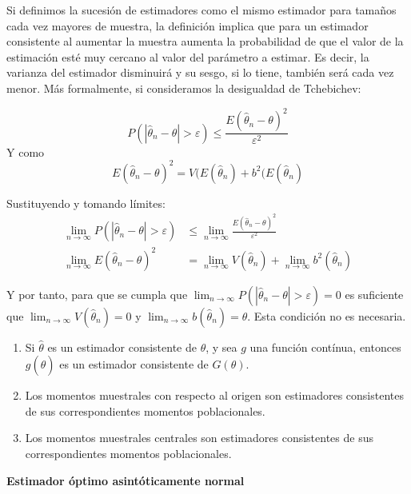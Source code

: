 Si definimos la sucesi\'on de estimadores como el mismo estimador para tama\~nos cada vez mayores de muestra, la definici\'on implica que para un estimador consistente al aumentar la muestra aumenta la probabilidad de que el valor de la estimaci\'on est\'e muy cercano al valor del par\'ametro a estimar. Es decir, la varianza del estimador disminuir\'a y su sesgo, si lo tiene, tambi\'en ser\'a cada vez menor. M\'as formalmente, si consideramos la desigualdad de Tchebichev:

\begin{equation*}
P\left(\left|\hat{\theta}_n-\theta\right|>\varepsilon\right)\leq\frac{E(\hat{\theta}_n-\theta)^2}{\varepsilon^2}
\end{equation*}
Y como
\begin{equation*}
E(\hat{\theta}_n-\theta)^2=V(E(\hat{\theta}_n)+b^2(E(\hat{\theta}_n)
\end{equation*}

Sustituyendo y tomando l\'imites:
\begin{align*}
\lim_{n\to\infty}P\left(\left|\hat{\theta}_n-\theta\right|>\varepsilon\right)&\leq\lim_{n\to\infty}\frac{E(\hat{\theta}_n-\theta)^2}{\varepsilon^2}\\
\lim_{n\to\infty}E(\hat{\theta}_n-\theta)^2&=\lim_{n\to\infty}V(\hat{\theta}_n)+\lim_{n\to\infty}b^2(\hat{\theta}_n)
\end{align*}

Y por tanto, para que se cumpla que $\lim_{n\to\infty}P\left(\left|\hat{\theta}_n-\theta\right|>\varepsilon\right)=0$ es suficiente que $\lim_{n\to\infty}V(\hat{\theta}_n)=0$ y $\lim_{n\to\infty}b(\hat{\theta}_n)=\theta$. Esta condici\'on no es necesaria.


\begin{enumerate}
\item Si $\hat{\theta}$ es un estimador consistente de $\theta$, y sea $g$ una funci\'on cont\'inua, entonces $g(\hat{\theta})$ es un estimador consistente de $G(\theta)$.
\item Los momentos muestrales con respecto al origen son estimadores consistentes de sus correspondientes momentos poblacionales.
\item Los momentos muestrales centrales son estimadores consistentes de sus correspondientes momentos poblacionales.
\end{enumerate}

\textbf{Estimador \'optimo asint\'oticamente normal}



